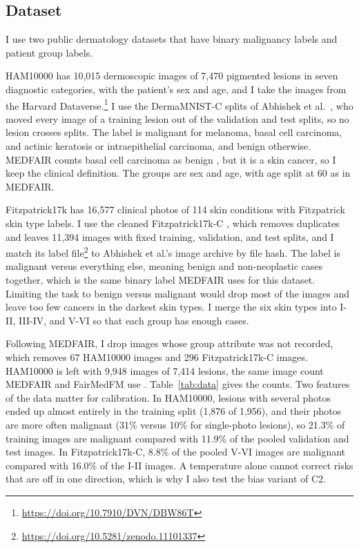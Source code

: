 \documentclass[sigconf,nonacm]{acmart}
\begin{document}
\subsection{Dataset}
\label{sec:data}

I use two public dermatology datasets that have binary malignancy labels and patient group labels.

HAM10000 \cite{tschandl2018ham10000} has 10,015 dermoscopic images of 7,470 pigmented lesions in seven diagnostic categories, with the patient's sex and age, and I take the images from the Harvard Dataverse.\footnote{\url{https://doi.org/10.7910/DVN/DBW86T}} I use the DermaMNIST-C splits of Abhishek et al.\ \cite{abhishek2025quality}, who moved every image of a training lesion out of the validation and test splits, so no lesion crosses splits. The label is malignant for melanoma, basal cell carcinoma, and actinic keratosis or intraepithelial carcinoma, and benign otherwise. MEDFAIR counts basal cell carcinoma as benign \cite{zong2023medfair}, but it is a skin cancer, so I keep the clinical definition. The groups are sex and age, with age split at 60 as in MEDFAIR.

Fitzpatrick17k \cite{groh2021fitzpatrick} has 16,577 clinical photos of 114 skin conditions with Fitzpatrick skin type labels. I use the cleaned Fitzpatrick17k-C \cite{abhishek2025quality}, which removes duplicates and leaves 11,394 images with fixed training, validation, and test splits, and I match its label file\footnote{\url{https://doi.org/10.5281/zenodo.11101337}} to Abhishek et al.'s image archive by file hash. The label is malignant versus everything else, meaning benign and non-neoplastic cases together, which is the same binary label MEDFAIR uses for this dataset. Limiting the task to benign versus malignant would drop most of the images and leave too few cancers in the darkest skin types. I merge the six skin types into I-II, III-IV, and V-VI so that each group has enough cases.

Following MEDFAIR, I drop images whose group attribute was not recorded, which removes 67 HAM10000 images and 296 Fitzpatrick17k-C images. HAM10000 is left with 9,948 images of 7,414 lesions, the same image count MEDFAIR and FairMedFM use \cite{zong2023medfair,jin2024fairmedfm}. Table~\ref{tab:data} gives the counts. Two features of the data matter for calibration. In HAM10000, lesions with several photos ended up almost entirely in the training split (1,876 of 1,956), and their photos are more often malignant (31\% versus 10\% for single-photo lesions), so 21.3\% of training images are malignant compared with 11.9\% of the pooled validation and test images. In Fitzpatrick17k-C, 8.8\% of the pooled V-VI images are malignant compared with 16.0\% of the I-II images. A temperature alone cannot correct risks that are off in one direction, which is why I also test the bias variant of C2.
\end{document}
